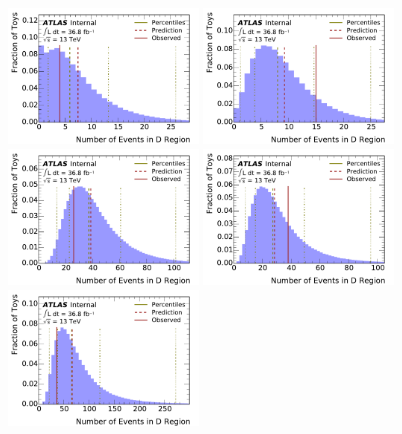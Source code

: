 \begin{figure}[htbp]
  \centering 
  {\includegraphics[width=0.45\textwidth]{figures/NinD_distribution_sig_VBF8_m20.pdf}}
  {\includegraphics[width=0.45\textwidth]{figures/NinD_distribution_sig_VBF8_m30.pdf}}\\
  {\includegraphics[width=0.45\textwidth]{figures/NinD_distribution_sig_VBF8_m40.pdf}}
  {\includegraphics[width=0.45\textwidth]{figures/NinD_distribution_sig_VBF8_m50.pdf}}\\
  {\includegraphics[width=0.45\textwidth]{figures/NinD_distribution_sig_VBF8_m60.pdf}}

\end{figure}
